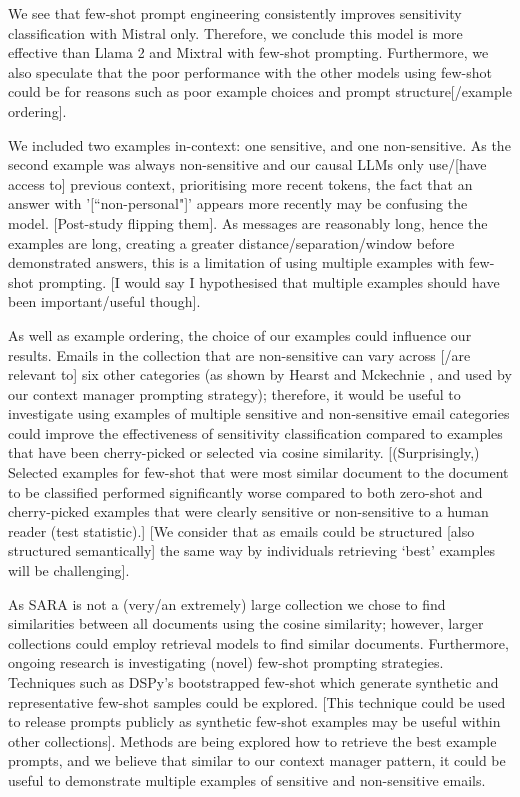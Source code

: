 We see that few-shot prompt engineering consistently improves sensitivity classification with Mistral only. Therefore, we conclude this model is more effective than Llama 2 and Mixtral with few-shot prompting. Furthermore, we also speculate that the poor performance with the other models using few-shot could be for reasons such as poor example choices and prompt structure[/example ordering].

We included two examples in-context: one sensitive, and one non-sensitive. As the second example was always non-sensitive and our causal LLMs only use/[have access to] previous context, prioritising more recent tokens, the fact that an answer with '[``non-personal"]' appears more recently may be confusing the model. [Post-study flipping them]. As messages are reasonably long, hence the examples are long, creating a greater distance/separation/window before demonstrated answers, this is a limitation of using multiple examples with few-shot prompting. [I would say I hypothesised that multiple examples should have been important/useful though].

As well as example ordering, the choice of our examples could influence our results. Emails in the collection that are non-sensitive can vary across [/are relevant to] six other categories (as shown by Hearst \cite{hearst2005teaching} and Mckechnie \cite{mckechnie2024sara}, and used by our context manager prompting strategy); therefore, it would be useful to investigate using examples of multiple sensitive and non-sensitive email categories could improve the effectiveness of sensitivity classification compared to examples that have been cherry-picked or selected via cosine similarity. [(Surprisingly,) Selected examples for few-shot that were most similar document to the document to be classified performed significantly worse compared to both zero-shot and cherry-picked examples that were clearly sensitive or non-sensitive to a human reader (test statistic).] [We consider that as emails could be structured [also structured semantically] the same way by individuals retrieving ‘best’ examples will be challenging].

As SARA is not a (very/an extremely) large collection we chose to find similarities between all documents using the cosine similarity; however, larger collections could employ retrieval models to find similar documents. Furthermore, ongoing research is investigating (novel) few-shot prompting strategies. Techniques such as DSPy’s bootstrapped few-shot which generate synthetic and representative few-shot samples could be explored. [This technique could be used to release prompts publicly as synthetic few-shot examples may be useful within other collections]. Methods are being explored how to retrieve the best example prompts, and we believe that similar to our context manager pattern, it could be useful to demonstrate multiple examples of sensitive and non-sensitive emails.

